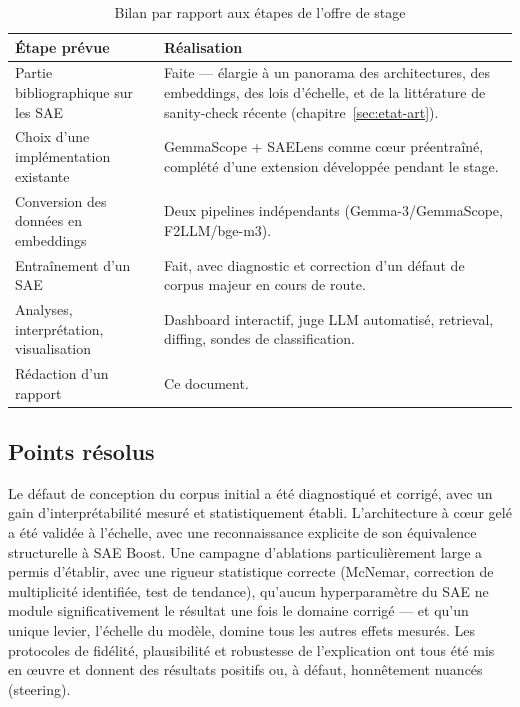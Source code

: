 \documentclass[11pt]{article}
\begin{document}
\begin{table}[h!]
\centering
\caption{Bilan par rapport aux étapes de l'offre de stage}
\vspace{0.4em}\small
\begin{tabular}{@{}p{5.5cm}p{8.5cm}@{}}
\toprule
\textbf{Étape prévue} & \textbf{Réalisation} \\ \midrule
Partie bibliographique sur les SAE & Faite --- élargie à un panorama des
  architectures, des embeddings, des lois d'échelle, et de la littérature de
  sanity-check récente (chapitre~\ref{sec:etat-art}). \\
Choix d'une implémentation existante & GemmaScope + SAELens comme cœur
  préentraîné, complété d'une extension développée pendant le stage. \\
Conversion des données en embeddings & Deux pipelines indépendants
  (Gemma-3/GemmaScope, F2LLM/bge-m3). \\
Entraînement d'un SAE & Fait, avec diagnostic et correction d'un défaut de
  corpus majeur en cours de route. \\
Analyses, interprétation, visualisation & Dashboard interactif, juge LLM
  automatisé, retrieval, diffing, sondes de classification. \\
Rédaction d'un rapport & Ce document. \\
\bottomrule
\end{tabular}
\end{table}

\subsection{Points résolus}

Le défaut de conception du corpus initial a été diagnostiqué et corrigé, avec
un gain d'interprétabilité mesuré et statistiquement établi. L'architecture à
cœur gelé a été validée à l'échelle, avec une reconnaissance explicite de son
équivalence structurelle à SAE Boost. Une campagne d'ablations
particulièrement large a permis d'établir, avec une rigueur statistique
correcte (McNemar, correction de multiplicité identifiée, test de tendance),
qu'aucun hyperparamètre du SAE ne module significativement le résultat une
fois le domaine corrigé --- et qu'un unique levier, l'échelle du modèle,
domine tous les autres effets mesurés. Les protocoles de fidélité,
plausibilité et robustesse de l'explication ont tous été mis en œuvre et
donnent des résultats positifs ou, à défaut, honnêtement nuancés (steering).
\end{document}
